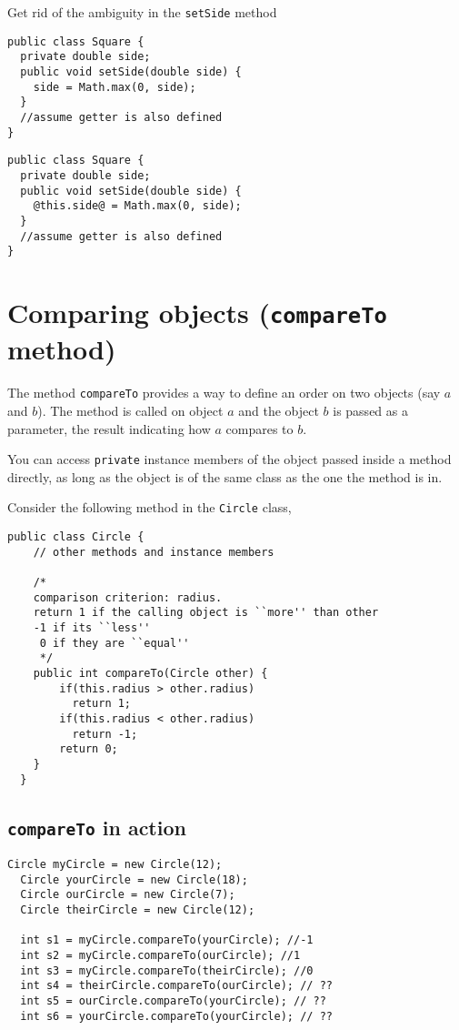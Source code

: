 \begin{exercise}
Get rid of the ambiguity in the \texttt{setSide} method
\begin{lstlisting}[frame=single,style=buggy]
public class Square {
  private double side;
  public void setSide(double side) {
    side = Math.max(0, side);
  }
  //assume getter is also defined
}
\end{lstlisting}  	
\end{exercise}
\begin{answer} 
\begin{lstlisting}
public class Square {
  private double side;
  public void setSide(double side) {
    @this.side@ = Math.max(0, side);
  }
  //assume getter is also defined
}
\end{lstlisting} 
\end{answer}


\section{Comparing objects (\texttt{compareTo} method)}

The method \texttt{compareTo} provides a way to define an order on two objects (say $a$ and $b$). The method is called on object $a$ and the object $b$ is passed as a parameter, the result indicating how $a$ compares to $b$.

\begin{flag}
You can access \texttt{private} instance members of the object passed inside a method directly, as long as the object is of the same class as the one the method is in.	
\end{flag}


  Consider the following method in the \texttt{Circle} class,
  \begin{lstlisting}[style=correct,basicstyle=\footnotesize]
  public class Circle {
    // other methods and instance members
    
    /* 
    comparison criterion: radius.
    return 1 if the calling object is ``more'' than other 
    -1 if its ``less''
     0 if they are ``equal'' 
     */
    public int compareTo(Circle other) {
        if(this.radius > other.radius)
  	      return 1;
        if(this.radius < other.radius)
          return -1;
        return 0; 
    }
  }
  \end{lstlisting}    
\clearpage
\subsection{\texttt{compareTo} in action}
  \begin{lstlisting}[frame=single,style=correct,basicstyle=\footnotesize]
  Circle myCircle = new Circle(12);
  Circle yourCircle = new Circle(18);
  Circle ourCircle = new Circle(7);
  Circle theirCircle = new Circle(12);
  
  int s1 = myCircle.compareTo(yourCircle); //-1
  int s2 = myCircle.compareTo(ourCircle); //1
  int s3 = myCircle.compareTo(theirCircle); //0
  int s4 = theirCircle.compareTo(ourCircle); // ??
  int s5 = ourCircle.compareTo(yourCircle); // ??
  int s6 = yourCircle.compareTo(yourCircle); // ??
  \end{lstlisting}  

